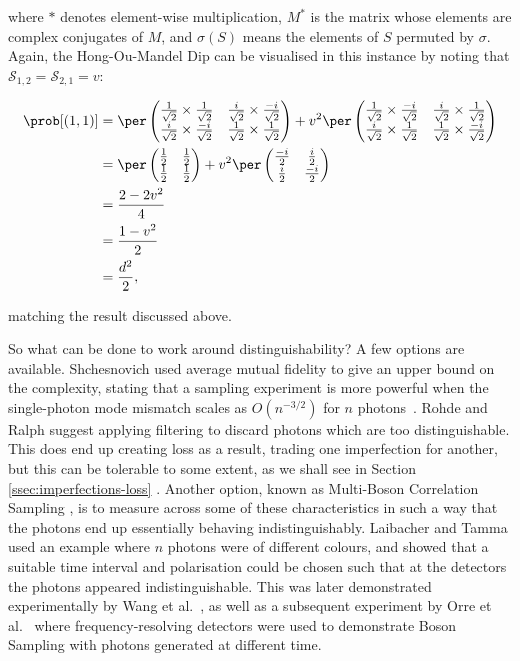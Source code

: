 \noindent where $*$ denotes element-wise multiplication, $M^*$ is the matrix whose elements are complex conjugates of $M$, and $\sigma(S)$ means the elements of $S$ permuted by $\sigma$. Again, the Hong-Ou-Mandel Dip can be visualised in this instance by noting that $\mathcal{S}_{1,2} = \mathcal{S}_{2,1} = v$:

\begin{align}
\prob[(1,1)] &= \per\begin{pmatrix}\frac{1}{\sqrt{2}}\times\frac{1}{\sqrt{2}}&\frac{i}{\sqrt{2}}\times\frac{-i}{\sqrt{2}}\\\frac{i}{\sqrt{2}}\times\frac{-i}{\sqrt{2}}&\frac{1}{\sqrt{2}}\times\frac{1}{\sqrt{2}}\end{pmatrix} + v^2 \per\begin{pmatrix}\frac{1}{\sqrt{2}}\times\frac{-i}{\sqrt{2}}&\frac{i}{\sqrt{2}}\times\frac{1}{\sqrt{2}}\\\frac{i}{\sqrt{2}}\times\frac{1}{\sqrt{2}}&\frac{1}{\sqrt{2}}\times\frac{-i}{\sqrt{2}}\end{pmatrix}\\
&= \per\begin{pmatrix}\frac{1}{2}&\frac{1}{2}\\\frac{1}{2}&\frac{1}{2}\end{pmatrix} + v^2 \per\begin{pmatrix}\frac{-i}{2}&\frac{i}{2}\\\frac{i}{2}&\frac{-i}{2}\end{pmatrix}\\
&= \frac{2-2v^2}{4}\\
&= \frac{1-v^2}{2}\\
&= \frac{d^2}{2},
\end{align}

\noindent matching the result discussed above.

So what can be done to work around distinguishability? A few options are available. Shchesnovich used average mutual fidelity to give an upper bound on the complexity, stating that a sampling experiment is more powerful when the single-photon mode mismatch scales as $O(n^{-3/2})$ for $n$ photons~\cite{shchesnovich2014}. Rohde and Ralph \cite{rohde2012} suggest applying filtering to discard photons which are too distinguishable. This does end up creating loss as a result, trading one imperfection for another, but this can be tolerable to some extent, as we shall see in Section \ref{ssec:imperfections-loss} \cite{rohde2012, aaronson2016}. Another option, known as Multi-Boson Correlation Sampling \cite{tamma2014, tamma2015, laibacher2015, tamma2016, laibacher2017}, is to measure across some of these characteristics in such a way that the photons end up essentially behaving indistinguishably. Laibacher and Tamma used an example where $n$ photons were of different colours, and showed that a suitable time interval and polarisation could be chosen such that at the detectors the photons appeared indistinguishable. This was later demonstrated experimentally by Wang et al.~\cite{wang2018timebin}, as well as a subsequent experiment by Orre et al.~\cite{orre2019} where frequency-resolving detectors were used to demonstrate Boson Sampling with photons generated at different time.

